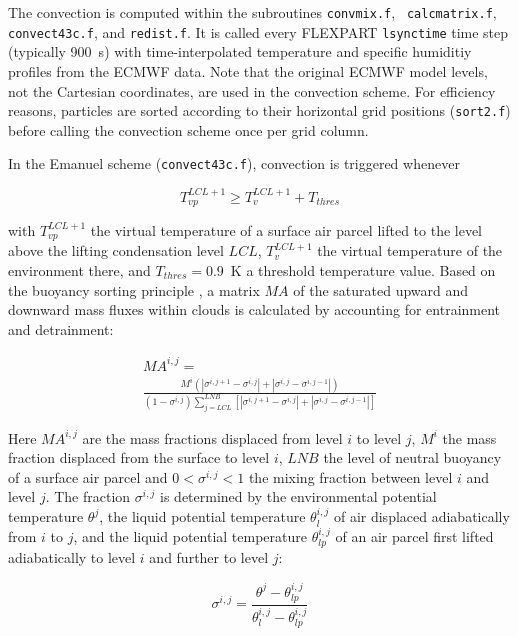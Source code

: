 \documentclass{egu}                  %
\begin{document}
The convection is computed within the subroutines {\tt convmix.f}, {\tt
calcmatrix.f}, {\tt convect43c.f}, and {\tt redist.f}.  It is called every
FLEXPART \verb|lsynctime| time step (typically 900~s) with time-interpolated
temperature and specific humiditiy profiles from the ECMWF data.  Note that the
original ECMWF model levels, not the Cartesian coordinates, are used in the
convection scheme.  For efficiency reasons, particles are sorted according to
their horizontal grid positions ({\tt sort2.f}) before calling the convection
scheme once per grid column.

In the Emanuel scheme ({\tt convect43c.f}), convection is triggered whenever

\begin{equation}
T_{vp}^{LCL+1} \ge T_{v}^{LCL+1} + T_{thres}
\end{equation} 

with $T_{vp}^{LCL+1}$ the virtual temperature of a surface air parcel lifted to
the level above the lifting condensation level $LCL$, $T_{v}^{LCL+1}$ the
virtual temperature of the environment there, and $T_{thres}=0.9$~K a threshold
temperature value.  Based on the buoyancy sorting principle \citep{emanuel1991,
telford1975}, a matrix $MA$ of the saturated upward and downward mass fluxes
within clouds is calculated by accounting for entrainment and detrainment:

\begin{multline}
MA^{i,j}=\\
\frac{M^i(|\sigma^{i,j+1}- \sigma^{i,j}|+ |\sigma^{i,j} - \sigma^{i,j-1}|)}{(1-\sigma^{i,j}) \displaystyle \sum_{j=LCL}^{LNB} [|\sigma^{i,j+1}- \sigma^{i,j}|+ |\sigma^{i,j} - \sigma^{i,j-1}|]}
\label{matrix}
\end{multline}

Here $MA^{i,j}$ are the mass fractions displaced from level $i$ to level $j$,
$M^{i}$ the mass fraction displaced from the surface to level $i$, $LNB$ the
level of neutral buoyancy of a surface air parcel and $0 < \sigma^{i,j} < 1 $
the mixing fraction between level $i$ and level $j$.  The fraction
$\sigma^{i,j}$ is determined by the environmental potential temperature
$\theta^{j}$, the liquid potential temperature $\theta_{l}^{i,j}$ of air
displaced adiabatically from $i$ to $j$, and the liquid potential temperature
$\theta_{lp}^{i,j}$ of an air parcel first lifted adiabatically to level $i$
and further to level $j$:

\begin{equation}
\sigma^{i,j}=\frac{\theta^{j}-\theta_{lp}^{i,j}}{\theta_{l}^{i,j}-\theta_{lp}^{i,j}}
\end{equation}
\end{document}
